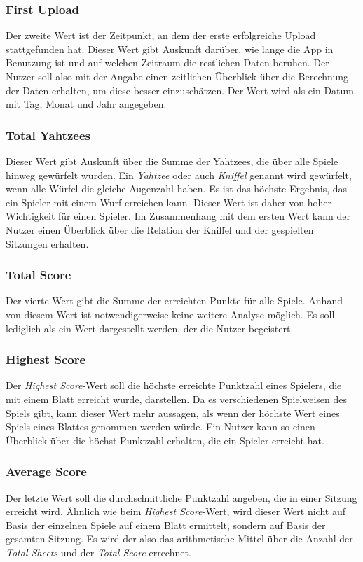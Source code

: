 \subsubsection{First Upload}
Der zweite Wert ist der Zeitpunkt, an dem der erste erfolgreiche Upload stattgefunden hat. Dieser Wert gibt Auskunft darüber, wie lange die App in Benutzung ist und auf welchen Zeitraum die restlichen Daten beruhen. Der Nutzer soll also mit der Angabe einen zeitlichen Überblick über die Berechnung der Daten erhalten, um diese besser einzuschätzen. Der Wert wird als ein Datum mit Tag, Monat und Jahr angegeben.

\subsubsection{Total Yahtzees}
Dieser Wert gibt Auskunft über die Summe der Yahtzees, die über alle Spiele hinweg gewürfelt wurden. Ein \textit{Yahtzee} oder auch \textit{Kniffel} genannt wird gewürfelt, wenn alle Würfel die gleiche Augenzahl haben. Es ist das höchste Ergebnis, das ein Spieler mit einem Wurf erreichen kann. Dieser Wert ist daher von hoher Wichtigkeit für einen Spieler. Im Zusammenhang mit dem ersten Wert kann der Nutzer einen Überblick über die Relation der Kniffel und der gespielten Sitzungen erhalten.

\subsubsection{Total Score}
Der vierte Wert gibt die Summe der erreichten Punkte für alle Spiele. Anhand von diesem Wert ist notwendigerweise keine weitere Analyse möglich. Es soll lediglich als ein Wert dargestellt werden, der die Nutzer begeistert.

\subsubsection{Highest Score}
Der \textit{Highest Score}-Wert soll die höchste erreichte Punktzahl eines Spielers, die mit einem Blatt erreicht wurde, darstellen. Da es verschiedenen Spielweisen des Spiels gibt, kann dieser Wert mehr aussagen, als wenn der höchste Wert eines Spiels eines Blattes genommen werden würde. Ein Nutzer kann so einen Überblick über die höchst Punktzahl erhalten, die ein Spieler erreicht hat.

\subsubsection{Average Score}
Der letzte Wert soll die durchschnittliche Punktzahl angeben, die in einer Sitzung erreicht wird. Ähnlich wie beim \textit{Highest Score}-Wert, wird dieser Wert nicht auf Basis der einzelnen Spiele auf einem Blatt ermittelt, sondern auf Basis der gesamten Sitzung. Es wird der also das arithmetische Mittel über die Anzahl der \textit{Total Sheets} und der \textit{Total Score} errechnet.

